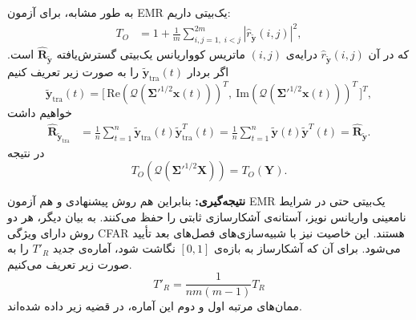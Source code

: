 به طور مشابه، برای آزمون EMR یک‌بیتی داریم:
\begin{align}
	T_{O}
	&=1+\frac{1}{m}\sum_{i,j=1,\; i<j}^{2m}
	|\hat r_{\tilde{\mathbf{y}}}(i,j)|^{2}, \label{eq:cfar3}
\end{align}
که در آن 
$\hat r_{\tilde{\mathbf{y}}}(i,j)$ 
درایه‌ی $(i,j)$ ماتریس کوواریانس یک‌بیتی گسترش‌یافته
$\hat{\mathbf{R}}_{\tilde{\mathbf{y}}}$ 
است.  
اگر بردار 
$\tilde{\mathbf{y}}_{\mathrm{tra}}(t)$ 
را به صورت زیر تعریف کنیم
\[
\tilde{\mathbf{y}}_{\mathrm{tra}}(t)=
\big[\,\mathrm{Re}(\mathcal{Q}(\mathbf{\Sigma}'^{1/2}\mathbf{x}(t)))^{T},~
\mathrm{Im}(\mathcal{Q}(\mathbf{\Sigma}'^{1/2}\mathbf{x}(t)))^{T}\,\big]^{T},
\]
خواهیم داشت
\begin{align}
	\hat{\mathbf{R}}_{\tilde{\mathbf{y}}_{\mathrm{tra}}}
	&=\frac{1}{n}\sum_{t=1}^{n}\tilde{\mathbf{y}}_{\mathrm{tra}}(t)\tilde{\mathbf{y}}_{\mathrm{tra}}^{T}(t)
	=\frac{1}{n}\sum_{t=1}^{n}\tilde{\mathbf{y}}(t)\tilde{\mathbf{y}}^{T}(t)
	=\hat{\mathbf{R}}_{\tilde{\mathbf{y}}}. \label{eq:cfar4}
\end{align}
در نتیجه
\[
T_{O}\!\left(\mathcal{Q}(\mathbf{\Sigma}'^{1/2}\mathbf{X})\right)=T_{O}(\mathbf{Y}).
\]

\noindent\textbf{نتیجه‌گیری:}  
بنابراین هم روش پیشنهادی و هم آزمون EMR یک‌بیتی حتی در شرایط نامعینی واریانس نویز، آستانه‌ی آشکارسازی ثابتی را حفظ می‌کنند.  
به بیان دیگر، هر دو روش دارای ویژگی CFAR هستند. این خاصیت نیز با شبیه‌سازی‌های فصل‌های بعد تأیید می‌شود.
برای آن که آشکارساز به بازه‌ی 
$[0, 1]$
نگاشت شود، آماره‌ی جدید
$T'_R$
را به صورت زیر تعریف می‌کنیم.
\begin{equation}
	T'_R=\frac{1}{nm(m-1)}T_R
\end{equation}
 ممان‌های مرتبه اول و دوم این آماره، در قضیه زیر داده شده‌اند.

